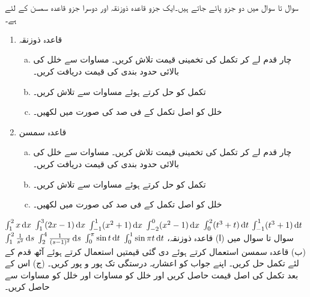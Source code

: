 \\
سوال  تا سوال  میں دو جزو پائے جاتے ہیں۔ایک جزو قاعدہ ذوزنقہ اور دوسرا جزو قاعدہ سمسن کے  لئے ہے۔
\begin{enumerate}[1.]
\item
قاعدہ ذوزنقہ
\begin{enumerate}[a.]
\item
چار قدم  لے کر تکمل کی تخمینی قیمت تلاش کریں۔ مساوات  سے خلل  کی بالائی حدود بندی کی قیمت دریافت کریں۔
\item
تکمل کو حل کرتے ہوئے مساوات  سے  تلاش کریں۔
\item
خلل  کو اصل تکمل  کے فی صد کی صورت میں لکھیں۔
\end{enumerate}
\item
قاعدہ سمسن
\begin{enumerate}[a.]
\item
چار قدم  لے کر تکمل کی تخمینی قیمت تلاش کریں۔ مساوات   سے خلل  کی بالائی حدود بندی کی قیمت دریافت کریں۔
\item
تکمل کو حل کرتے ہوئے مساوات  سے  تلاش کریں۔
\item
خلل  کو اصل تکمل  کے فی صد کی صورت میں لکھیں۔
\end{enumerate}
\end{enumerate}

$\int_1^2x\dif x$
$\int_1^3(2x-1)\dif x$
$\int_{-1}^{1}(x^2+1)\dif x$
$\int_{-2}^{0}(x^2-1)\dif x$
$\int_{0}^{2}(t^3+t)\dif t$
$\int_{-1}^{1}(t^3+1)\dif t$
$\int_{1}^{2}\tfrac{1}{s^2}\dif s$
$\int_{2}^{4}\tfrac{1}{(s-1)^2}\dif s$
$\int_{0}^{\pi}\sin t\dif t$
$\int_{0}^{1}\sin \pi t\dif t$
سوال  تا سوال  میں (ا) قاعدہ ذوزنقہ، (ب) قاعدہ سمسن استعمال کرتے ہوئے دی گئی قیمتیں استعمال کرتے ہوئے آٹھ قدم  کے لئے تکمل حل کریں۔ اپنے جواب کو  اعشاریہ درستگی تک پور و پور کریں۔ (ج) اس کے بعد تکمل کی اصل قیمت حاصل کریں اور خلل   کو مساوات  اور خلل  کو مساوات  سے حاصل کریں۔


